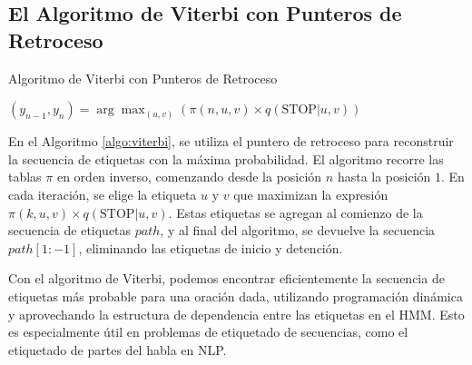 \subsection{El Algoritmo de Viterbi con Punteros de Retroceso}

\begin{algorithm}[H]



\BlankLine
\SetAlgoLined
\caption{Algoritmo de Viterbi con Punteros de Retroceso}
\label{algo:viterbi}
\BlankLine




\BlankLine
$(y_{n-1}, y_n) = \arg \max_{(u,v)} (\pi(n, u, v) \times q(\text{STOP}|u, v))$ 

\BlankLine
{} 
\end{algorithm}

En el Algoritmo \ref{algo:viterbi}, se utiliza el puntero de retroceso para reconstruir la secuencia de etiquetas con la máxima probabilidad. El algoritmo recorre las tablas $\pi$ en orden inverso, comenzando desde la posición $n$ hasta la posición $1$. En cada iteración, se elige la etiqueta $u$ y $v$ que maximizan la expresión $\pi(k, u, v) \times q(\text{STOP}|u, v)$. Estas etiquetas se agregan al comienzo de la secuencia de etiquetas $path$, y al final del algoritmo, se devuelve la secuencia $path[1:-1]$, eliminando las etiquetas de inicio y detención.

Con el algoritmo de Viterbi, podemos encontrar eficientemente la secuencia de etiquetas más probable para una oración dada, utilizando programación dinámica y aprovechando la estructura de dependencia entre las etiquetas en el HMM. Esto es especialmente útil en problemas de etiquetado de secuencias, como el etiquetado de partes del habla en NLP. 

